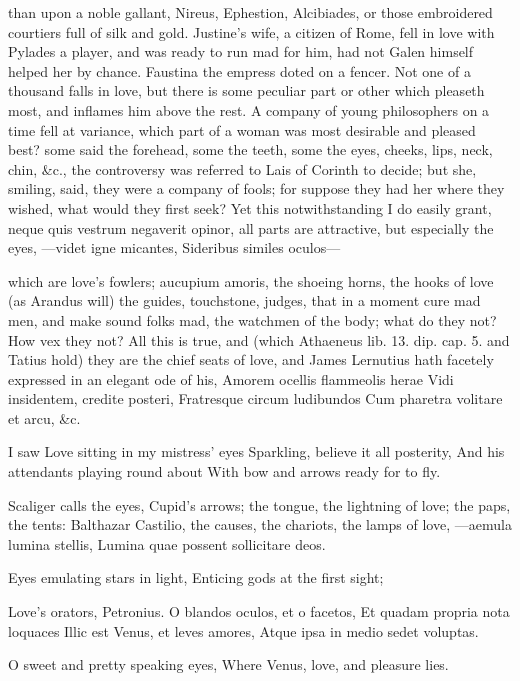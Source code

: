 {than upon a noble gallant, Nireus, Ephestion, Alcibiades, or those
embroidered courtiers full of silk and gold. Justine's wife, a
citizen of Rome, fell in love with Pylades a player, and was ready to
run mad for him, had not Galen himself helped her by chance. Faustina
the empress doted on a fencer.
Not one of a thousand falls in love, but there is some peculiar part or
other which pleaseth most, and inflames him above the rest. A
company of young philosophers on a time fell at variance, which part of
a woman was most desirable and pleased best? some said the forehead,
some the teeth, some the eyes, cheeks, lips, neck, chin, \&c., the
controversy was referred to Lais of Corinth to decide; but she,
smiling, said, they were a company of fools; for suppose they had her
where they wished, what would they first seek? Yet this
notwithstanding I do easily grant, neque quis vestrum negaverit opinor,
all parts are attractive, but especially the eyes, 
---videt igne micantes,
Sideribus similes oculos---

which are love's fowlers; aucupium amoris, the shoeing horns, the
hooks of love (as Arandus will) the guides, touchstone, judges, that in
a moment cure mad men, and make sound folks mad, the watchmen of the
body; what do they not? How vex they not? All this is true, and (which
Athaeneus lib. 13. dip. cap. 5. and Tatius hold) they are the chief
seats of love, and James Lernutius hath facetely expressed in an
elegant ode of his,
Amorem ocellis flammeolis herae
Vidi insidentem, credite posteri,
Fratresque circum ludibundos
Cum pharetra volitare et arcu, \&c.

I saw Love sitting in my mistress' eyes
Sparkling, believe it all posterity,
And his attendants playing round about
With bow and arrows ready for to fly.

Scaliger calls the eyes, Cupid's arrows; the tongue, the
lightning of love; the paps, the tents: Balthazar Castilio, the
causes, the chariots, the lamps of love,
---aemula lumina stellis,
Lumina quae possent sollicitare deos.

Eyes emulating stars in light,
Enticing gods at the first sight;

Love's orators, Petronius.
O blandos oculos, et o facetos,
Et quadam propria nota loquaces
Illic est Venus, et leves amores,
Atque ipsa in medio sedet voluptas.

O sweet and pretty speaking eyes,
Where Venus, love, and pleasure lies.

}
